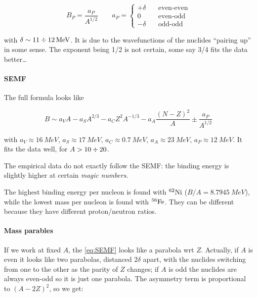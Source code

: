 \documentclass{article}
\begin{document}
\begin{equation}
    B_P = \frac{a_P}{A^{1/2}} \qquad a_P = \begin{cases}
        + \delta \quad &\text{even-even}  \\
        0 \quad &\text{even-odd}  \\
        - \delta \quad &\text{odd-odd}
\end{cases}
\end{equation}

with \(\delta \sim 11 \divisionsymbol \SI{12}{MeV} \). It is due to the wavefunctions of the nuclides ``pairing up'' in some sense. The exponent being 1/2 is not certain, some say 3/4 fits the data better\dots

\paragraph{SEMF}

The full formula looks like

\begin{equation} \label{eq:SEMF}
    B \sim a_V A - a_S A ^{2/3} - a_C Z^2 A ^{-1/3} - a_A \frac{(N-Z)^2}{A} \pm \frac{a_P}{A^{1/2}}
\end{equation}

with \(a_V \approx \SI{16}{MeV} \), \(a_S \approx \SI{17}{MeV} \), \(a_C \approx \SI{0.7}{MeV} \), \(a_A \approx \SI{23}{MeV} \), \(a_P \approx \SI{12}{MeV} \). It fits the data well, for \(A>10 \divisionsymbol 20\).

The empirical data do not exactly follow the SEMF: the binding energy is slightly higher at certain \emph{magic numbers}.

The highest binding energy per nucleon is found with \(^{62} \ce{Ni} \) (\(B/A = \SI{8.7945}{MeV} \)), while the lowest mass per nucleon is found with \(^{56} \ce{Fe} \). They can be different because they have different proton/neutron ratios.

\paragraph{Mass parables}

If we work at fixed \(A\), the \eqref{eq:SEMF} looks like a parabola wrt \(Z\). Actually, if \(A\) is even it looks like two parabolas, distanced \(2\delta\) apart, with the nuclides switching from one to the other as the parity of \(Z\) changes; if \(A\) is odd the nuclides are always even-odd so it is just one parabola. The asymmetry term is proportional to \((A-2Z)^2\), so we get:
\end{document}

